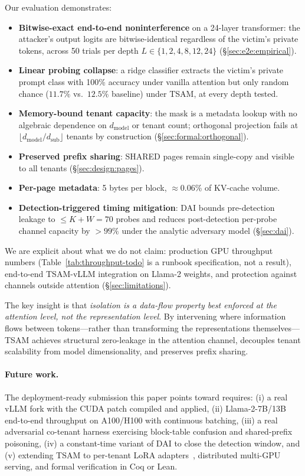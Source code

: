 \documentclass[11pt]{article}
\begin{document}
Our evaluation demonstrates:
\begin{itemize}[leftmargin=*,itemsep=2pt]
    \item \textbf{Bitwise-exact end-to-end noninterference} on a 24-layer
      transformer: the attacker's output logits are bitwise-identical
      regardless of the victim's private tokens, across 50 trials per
      depth $L \in \{1,2,4,8,12,24\}$ (\S\ref{sec:e2e:empirical}).
    \item \textbf{Linear probing collapse}: a ridge classifier extracts
      the victim's private prompt class with 100\% accuracy under
      vanilla attention but only random chance ($11.7\%$ vs.\ $12.5\%$
      baseline) under TSAM, at every depth tested.
    \item \textbf{Memory-bound tenant capacity}: the mask is a metadata
      lookup with no algebraic dependence on $d_{\mathrm{model}}$ or
      tenant count; orthogonal projection fails at
      $\lfloor d_{\mathrm{model}}/d_{\mathrm{sub}} \rfloor$ tenants by
      construction (\S\ref{sec:formal:orthogonal}).
    \item \textbf{Preserved prefix sharing}: SHARED pages remain
      single-copy and visible to all tenants (\S\ref{sec:design:pages}).
    \item \textbf{Per-page metadata}: 5 bytes per block, $\approx$0.06\%
      of KV-cache volume.
    \item \textbf{Detection-triggered timing mitigation}: DAI bounds
      pre-detection leakage to $\leq K + W = 70$ probes and reduces
      post-detection per-probe channel capacity by $>99\%$ under the
      analytic adversary model (\S\ref{sec:dai}).
\end{itemize}

We are explicit about what we do not claim: production GPU
throughput numbers (Table~\ref{tab:throughput-todo} is a runbook
specification, not a result), end-to-end TSAM-vLLM integration on
Llama-2 weights, and protection against channels outside attention
(\S\ref{sec:limitations}).

The key insight is that \emph{isolation is a data-flow property best
enforced at the attention level, not the representation level}.  By
intervening where information flows between tokens---rather than
transforming the representations themselves---TSAM achieves structural
zero-leakage in the attention channel, decouples tenant scalability
from model dimensionality, and preserves prefix sharing.

\paragraph{Future work.}  The deployment-ready submission this paper
points toward requires: (i) a real vLLM fork with the CUDA patch
compiled and applied, (ii) Llama-2-7B/13B end-to-end throughput on
A100/H100 with continuous batching, (iii) a real adversarial co-tenant
harness exercising block-table confusion and shared-prefix poisoning,
(iv) a constant-time variant of DAI to close the detection window, and
(v) extending TSAM to per-tenant LoRA adapters~\citep{hu2022lora,
sheng2023slora}, distributed multi-GPU serving, and formal verification
in Coq or Lean.




\end{document}
